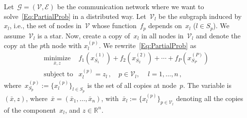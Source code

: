 \documentclass[letter,10pt]{article}
\theoremstyle{definition}
\theoremstyle{nonumberplain}
\newcommand{\mypar}[1]{\bigskip\noindent {\bf #1.}}
\begin{document}
\mypar{Derivation}
	Let~$\mathcal{G} = (\mathcal{V},\mathcal{E})$ be the communication network where we want to solve~\eqref{Eq:PartialProb} in a distributed way. Let~$\mathcal{V}_l$ be the subgraph induced by~$x_l$, i.e., the set of nodes in~$\mathcal{V}$ whose function~$f_p$ depends on~$x_l$ ($l \in S_p$). We assume~$\mathcal{V}_l$ is a star. Now, create a copy of~$x_l$ in all nodes in~$\mathcal{V}_l$ and denote the copy at the $p$th node with $x_l^{(p)}$. We rewrite~\eqref{Eq:PartialProb} as
	\begin{equation}\label{Eq:Prob2}
		\begin{array}{ll}
			\underset{\bar{x},z}{\text{minimize}} & f_1(x_{S_1}^{(1)}) + f_2(x_{S_2}^{(2)}) + \cdots + f_P(x_{S_P}^{(P)}) \\
			\text{subject to} & x_l^{(p)} = z_l\,,\quad p \in \mathcal{V}_l,\, \quad l = 1,\ldots,n\,,
		\end{array}
	\end{equation}
	where~$x_{S_p}^{(p)} := \{x_l^{(p)}\}_{l \in S_p}$ is the set of all copies at node~$p$. The variable is~$(\bar{x},z)$, where~$\bar{x} = (\bar{x}_1,\ldots,\bar{x}_n)$, with~$\bar{x}_l := \{x_l^{(p)}\}_{p \in \mathcal{V}_l}$ denoting all the copies of the component~$x_l$, and $z \in \mathbb{R}^n$.
\end{document}
